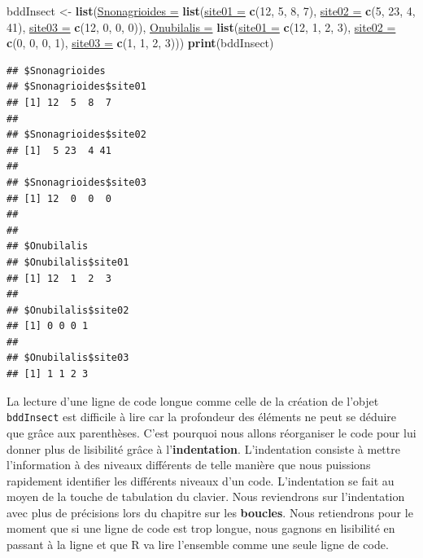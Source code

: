 \documentclass[twoside,symmetric]{book}
\newenvironment{Shaded}{}{}
\newcommand{\DataTypeTok}[1]{\underline{#1}}
\newcommand{\DecValTok}[1]{#1}
\newcommand{\KeywordTok}[1]{\textbf{#1}}
\newcommand{\NormalTok}[1]{#1}
\newcommand{\StringTok}[1]{#1}
\begin{document}
\begin{Shaded}
\begin{Highlighting}[]
\NormalTok{bddInsect <-}\StringTok{ }\KeywordTok{list}\NormalTok{(}\DataTypeTok{Snonagrioides =} \KeywordTok{list}\NormalTok{(}\DataTypeTok{site01 =} \KeywordTok{c}\NormalTok{(}\DecValTok{12}\NormalTok{, }\DecValTok{5}\NormalTok{, }\DecValTok{8}\NormalTok{, }\DecValTok{7}\NormalTok{), }
\DataTypeTok{site02 =} \KeywordTok{c}\NormalTok{(}\DecValTok{5}\NormalTok{, }\DecValTok{23}\NormalTok{, }\DecValTok{4}\NormalTok{, }\DecValTok{41}\NormalTok{), }\DataTypeTok{site03 =} \KeywordTok{c}\NormalTok{(}\DecValTok{12}\NormalTok{, }\DecValTok{0}\NormalTok{, }\DecValTok{0}\NormalTok{, }\DecValTok{0}\NormalTok{)), }\DataTypeTok{Onubilalis =} 
\KeywordTok{list}\NormalTok{(}\DataTypeTok{site01 =} \KeywordTok{c}\NormalTok{(}\DecValTok{12}\NormalTok{, }\DecValTok{1}\NormalTok{, }\DecValTok{2}\NormalTok{, }\DecValTok{3}\NormalTok{), }\DataTypeTok{site02 =} \KeywordTok{c}\NormalTok{(}\DecValTok{0}\NormalTok{, }\DecValTok{0}\NormalTok{, }\DecValTok{0}\NormalTok{, }\DecValTok{1}\NormalTok{), }\DataTypeTok{site03 =} 
\KeywordTok{c}\NormalTok{(}\DecValTok{1}\NormalTok{, }\DecValTok{1}\NormalTok{, }\DecValTok{2}\NormalTok{, }\DecValTok{3}\NormalTok{)))}
\KeywordTok{print}\NormalTok{(bddInsect)}
\end{Highlighting}
\end{Shaded}

\begin{verbatim}
## $Snonagrioides
## $Snonagrioides$site01
## [1] 12  5  8  7
## 
## $Snonagrioides$site02
## [1]  5 23  4 41
## 
## $Snonagrioides$site03
## [1] 12  0  0  0
## 
## 
## $Onubilalis
## $Onubilalis$site01
## [1] 12  1  2  3
## 
## $Onubilalis$site02
## [1] 0 0 0 1
## 
## $Onubilalis$site03
## [1] 1 1 2 3
\end{verbatim}

La lecture d'une ligne de code longue comme celle de la création de l'objet \texttt{bddInsect} est difficile à lire car la profondeur des éléments ne peut se déduire que grâce aux parenthèses. C'est pourquoi nous allons réorganiser le code pour lui donner plus de lisibilité grâce à l'\textbf{indentation}. L'indentation consiste à mettre l'information à des niveaux différents de telle manière que nous puissions rapidement identifier les différents niveaux d'un code. L'indentation se fait au moyen de la touche de tabulation du clavier. Nous reviendrons sur l'indentation avec plus de précisions lors du chapitre sur les \textbf{boucles}. Nous retiendrons pour le moment que si une ligne de code est trop longue, nous gagnons en lisibilité en passant à la ligne et que R va lire l'ensemble comme une seule ligne de code.
\end{document}
